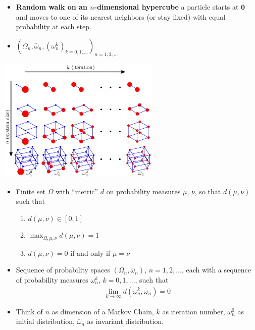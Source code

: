 \documentclass[12pt,t]{beamer}
\begin{document}
\begin{frame}
    \begin{itemize}
     \item \textbf{Random walk on an $n$-dimensional hypercube} a particle starts at $\mathbf{0}$ and moves to one of its nearest neighbors (or stay fixed) with equal probability at each step.
     \item $(\Omega_n,\bar{\omega}_n, (\omega^k_n)_{k=0,1,...})_{n=1,2,...}$
    \end{itemize}
    \vspace{-0.2cm}
    \begin{center}
      \includegraphics[width=0.58\textwidth]{cutoffdef}
    \end{center}
\end{frame}
\begin{frame}
  \begin{itemize}
  \item Finite set $\Omega$ with ``metric'' $d$ on
    probability measures $\mu$, $\nu$, so that
    $d(\mu,\nu)$ such that 
    \begin{enumerate}
    \item $d(\mu,\nu)\in [0,1]$
    \item $\max_{\Omega,\mu,\nu} d(\mu,\nu) = 1$
    \item $d(\mu,\nu)=0$ if and only if $\mu=\nu$
    \end{enumerate}
  \item Sequence of probability spaces $(\Omega_n,\bar{\omega}_n)$,
    $n=1,2,\ldots$, each with a sequence of probability measures
    $\omega^k_n$, $k=0,1,\ldots$, such that
    \begin{align*}
      \lim_{k \rightarrow \infty} d(\omega^k_n,\bar{\omega}_n)=0
    \end{align*}
  \item Think of $n$ as dimension of a Markov Chain, $k$ as iteration
    number, $\omega^0_n$ as initial distribution, $\bar{\omega}_n$ as invariant
    distribution.
  \end{itemize}
\end{frame}
\end{document}
